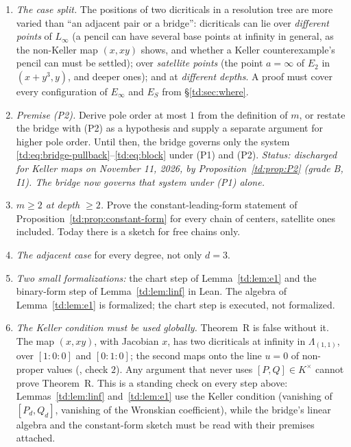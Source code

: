 \documentclass[a4paper,11pt]{article}
\newcommand{\filename}[1]{\texttt{\seqsplit{#1}}}
\theoremstyle{jsplain}
\theoremstyle{jsdef}
\theoremstyle{jsrem}
\begin{document}
\begin{enumerate}[label=O\arabic*.,leftmargin=*]
\item \emph{The case split.} The positions of two dicriticals in a resolution
tree are more varied than ``an adjacent pair or a bridge'': dicriticals can lie over
\emph{different points} of $L_\infty$ (a pencil can have several base points at infinity in
general, as the non-Keller map $(x, xy)$ shows, and whether a Keller counterexample's pencil
can must be settled); over \emph{satellite points} (the point $a = \infty$ of $E_2$ in
$(x + y^3, y)$, and deeper ones); and at \emph{different depths}. A proof must cover every
configuration of $E_\infty$ and $E_S$ from \S\ref{td:sec:where}.
\item \emph{Premise (P2).} Derive pole order at most $1$ from the definition of
$m$, or restate the bridge with (P2) as a hypothesis and supply a separate argument for
higher pole order. Until then, the bridge governs only the system
\eqref{td:eq:bridge-pullback}--\eqref{td:eq:block} under (P1) and (P2). \emph{Status: discharged for
Keller maps on November 11, 2026, by Proposition~\ref{td:prop:P2} (grade B, I1). The bridge now
governs that system under (P1) alone.}
\item \emph{$m \geq 2$ at depth $\geq 2$.} Prove the constant-leading-form
statement of Proposition~\ref{td:prop:constant-form} for every chain of centers, satellite ones
included. Today there is a sketch for free chains only.
\item \emph{The adjacent case} for every degree, not only $d = 3$.
\item \emph{Two small formalizations:} the chart step of Lemma~\ref{td:lem:e1}
and the binary-form step of Lemma~\ref{td:lem:linf} in Lean. The algebra of Lemma~\ref{td:lem:e1}
is formalized; the chart step is executed, not formalized.
\item \emph{The Keller condition must be used globally.} Theorem~R is false
without it. The map $(x, xy)$, with Jacobian $x$, has two dicriticals at infinity in
$\Lambda_{(1,1)}$, over $[1 : 0 : 0]$ and $[0 : 1 : 0]$; the second maps onto the line $u = 0$
of non-proper values (\filename{restatement\_checks.py}, check $2$). Any argument that never
uses $[P,Q] \in K^\times$ cannot prove Theorem~R. This is a standing check on every step
above: Lemmas~\ref{td:lem:linf} and~\ref{td:lem:e1} use the Keller condition (vanishing of
$[P_d, Q_d]$, vanishing of the Wronskian coefficient), while the bridge's linear algebra and
the constant-form sketch must be read with their premises attached.
\end{enumerate}
\end{document}
